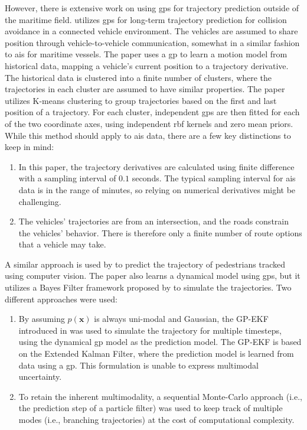 However, there is extensive  work on using \acrshort{gp}s for trajectory prediction outside of the maritime field. \citeauthor{vehicle_gp_prediction} \cite{vehicle_gp_prediction} utilizes \acrshort{gp}s for long-term trajectory prediction for collision avoidance in a connected vehicle environment. The vehicles are assumed to share position through vehicle-to-vehicle communication, somewhat in a similar fashion to \acrshort{ais} for maritime vessels. The paper uses a \acrshort{gp} to learn a motion model from historical data, mapping a vehicle's current position to a trajectory derivative. The historical data is clustered into a finite number of clusters, where the trajectories in each cluster are assumed to have similar properties. The paper utilizes K-means clustering \cite{murphy} to group trajectories based on the first and last position of a trajectory. For each cluster, independent \acrshort{gp}s are then fitted for each of the two coordinate axes, using independent \acrshort{rbf} kernels and zero mean priors. While this method should apply to \acrshort{ais} data, there are a few key distinctions to keep in mind:
\begin{enumerate}
    \item In this paper, the trajectory derivatives are calculated using finite difference with a sampling interval of $0.1$ seconds. The typical sampling interval for \acrshort{ais} data is in the range of minutes, so relying on numerical derivatives might be challenging.
    \item The vehicles' trajectories are from an intersection, and the roads constrain the vehicles' behavior. There is therefore only a finite number of route options that a vehicle may take.
\end{enumerate}

A similar approach is used by \citeauthor{pedestrian} \cite{pedestrian} to predict the trajectory of pedestrians tracked using computer vision. The paper also learns a dynamical model using \acrshort{gp}s, but it utilizes a Bayes Filter framework proposed by \citeauthor{gpekf} \cite{gpekf} to simulate the trajectories. Two different approaches were used:
\begin{enumerate}
    \item By assuming $p(\boldsymbol{x})$ is always uni-modal and Gaussian, the GP-EKF introduced in \cite{gpekf} was used to simulate the trajectory for multiple timesteps, using the dynamical \acrshort{gp} model as the prediction model. The GP-EKF is based on the Extended Kalman Filter, where the prediction model is learned from data using a \acrshort{gp}. This formulation is unable to express multimodal uncertainty.
    \item To retain the inherent multimodality, a sequential Monte-Carlo approach (i.e., the prediction step of a particle filter) was used to keep track of multiple modes (i.e., branching trajectories) at the cost of computational complexity.  
\end{enumerate}

